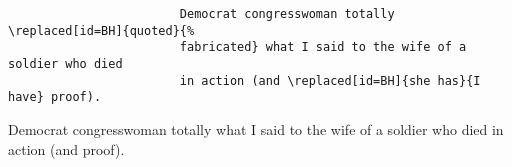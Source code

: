 \documentclass[french]{article}
\begin{document}
				\begin{shaded*}
					\begin{verbatim}
						Democrat congresswoman totally \replaced[id=BH]{quoted}{%
						fabricated} what I said to the wife of a soldier who died
						in action (and \replaced[id=BH]{she has}{I have} proof).
					\end{verbatim}
				\end{shaded*}
			
				\begin{leftbar}
					Democrat congresswoman totally  what I said to the wife of a soldier who died
					in action (and  proof).
				\end{leftbar}
			
\end{document}
